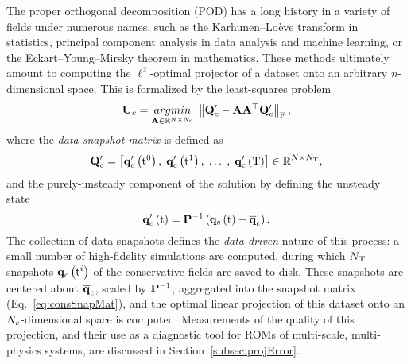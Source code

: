 The proper orthogonal decomposition (POD) has a long history in a variety of fields under numerous names, such as the Karhunen--Loève transform in statistics, principal component analysis in data analysis and machine learning, or the Eckart--Young--Mirsky theorem in mathematics. These methods ultimately amount to computing the $\ell^2$-optimal projector of a dataset onto an arbitrary $n$-dimensional space. This is formalized by the least-squares problem
%
\begin{equation}\label{eq:podLS}
    \consTrial = \argmin{\dummyMatOne \inRTwo{\numDOF}{\numConsModes}} \norm{ \consDataMatUns - \dummyMatOne \dummyMatOne^\top \consDataMatUns }_\text{F},
\end{equation}
%
where the \textit{data snapshot matrix} is defined as
%
\begin{equation}\label{eq:consSnapMat}
	\consDataMatUns = \left[ \consFuncUns{\initTime}, \; \consFuncUns{\timeVar^1}, \; \hdots \; , \; \consFuncUns{\finalTime} \right] \in \RTwo{\numDOF}{\numSnaps},
\end{equation}
%
and the purely-unsteady component of the solution by defining the unsteady state
%
\begin{equation}\label{eq:consUns}
	\consFuncUns{\timeVar} = \consScaleInv \left(\consFunc{\timeVar} - \consVecCent\right).
\end{equation}
%
The collection of data snapshots defines the \textit{data-driven} nature of this process: a small number of high-fidelity simulations are computed, during which $N_{\text{T}}$ snapshots $\mathbf{q}_c \left(\text{t}^{i}\right)$ of the conservative fields are saved to disk. These snapshots are centered about $\mathbf{\overline{q}}_c$, scaled by $\consScaleInv$, aggregated into the snapshot matrix (Eq.~\ref{eq:consSnapMat}), and the optimal linear projection of this dataset onto an $N_c$-dimensional space is computed. Measurements of the quality of this projection, and their use as a diagnostic tool for ROMs of multi-scale, multi-physics systems, are discussed in Section~\ref{subsec:projError}.

